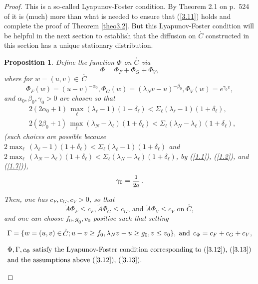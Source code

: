 \documentclass[12pt,leqno]{article}
\def\n{\noindent}
\def\dis{\displaystyle}
\def\f{\footnotesize}
\def\wt{\widetilde}
\newtheorem{proposition}[theorem]{Proposition}
\begin{document}
\begin{proof}
\medskip
This is a so-called Lyapunov-Foster condition. By Theorem 2.1 on p.~524 of \cite{MeynTwee93} it is (much) more than what is needed to ensure that (\ref{3.11}) holds and complete the proof of Theorem \ref{theo3.2}. But this Lyapunov-Foster condition will be helpful in the next section to establish that the diffusion on $\stackrel{_\circ}{C}$ constructed in this section has a unique stationary distribution.

\begin{proposition}\label{prop3.3}
Define the function $\Phi$ on $\stackrel{_\circ}{C}$ via
\begin{equation}\label{3.14}
\Phi = \Phi_F + \Phi_G + \Phi_V,
\end{equation}
where for $w = (u,v) \in\, \stackrel{_\circ}{C}$
\begin{equation}\label{3.15}
\Phi_F(w) = (u-v)^{-\alpha_0}, \Phi_G(w) = (\lambda_N v-u)^{-\beta_0}, \Phi_V(w) = e^{\gamma_0 v},
\end{equation}
and $\alpha_0, \beta_0, \gamma_0 > 0$ are chosen so that
\begin{align}
& 2(2 \alpha_0 + 1) \, \max\limits_\ell (\lambda_\ell - 1) (1 + \delta_\ell) < \Sigma_\ell (\lambda_\ell - 1) (1 + \delta_\ell), \label{3.16}
\\[1ex]
& 2(2 \beta_0 + 1) \, \max\limits_\ell (\lambda_N - \lambda_\ell) (1 + \delta_\ell) < \Sigma_\ell (\lambda_N  - \lambda_\ell) (1 + \delta_\ell), \label{3.17}
\end{align}
(such choices are possible because $2 \max_\ell \,(\lambda_\ell - 1)(1 + \delta_\ell) < \Sigma_\ell (\lambda_\ell -1)(1 + \delta_\ell)$ and $2 \max_\ell \,(\lambda_N - \lambda_\ell) (1 + \delta_\ell) < \Sigma_\ell (\lambda_N - \lambda_\ell) (1 + \delta_\ell)$, by {\rm (\ref{1.1}), (\ref{1.2})}, and {\rm (\ref{1.7})}), 
\begin{equation}\label{3.18}
\gamma_0 = \mbox{\f $\dis\frac{1}{2a}$}\,.
\end{equation}

\n
Then, one has $c_F, c_G, c_V > 0$, so that
\begin{equation}\label{3.19}
\mbox{$\wt{A} \Phi_F \le c_F, \wt{A} \Phi_G \le c_G$, and $\wt{A} \Phi_V \le c_V$ on $\stackrel{_\circ}{C}$},
\end{equation}
and one can choose $f_0, g_0, v_0$ positive such that setting
\begin{align}
&\Gamma = \{w = (u,v) \in \, \stackrel{_\circ}{C}; u-v \ge f_0, \lambda_N v - u \ge g_0, v \le v_0\}, \; \mbox{and} \;\, c_\Phi = c_F + c_G + c_V, \label{3.20}
\\[2ex]
&\mbox{$\Phi, \Gamma, c_\Phi$ satisfy the Lyapunov-Foster condition corresponding to {\rm (\ref{3.12}), (\ref{3.13})}} \label{3.21}
\\
&\mbox{and the assumptions above {\rm (\ref{3.12}), (\ref{3.13})}}. \nonumber
\end{align}
\end{proposition}


\end{proof}
\end{document}
